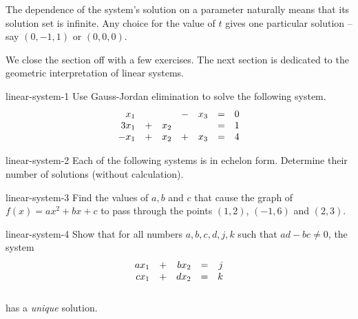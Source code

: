 The dependence of the system's solution on a parameter naturally means that its
solution set is infinite. Any choice for the value of $t$ gives one particular
solution -- say $(0,-1,1)$ or $(0,0,0)$.

We close the section off with a few exercises. The next section is dedicated to
the geometric interpretation of linear systems.

\begin{exercise}{}{linear-system-1}
 Use Gauss-Jordan elimination to solve the following system.
 \[
  \begin{array}{r c r c r c r}
   x_1 & &  & - & x_3 & = & 0\\
   3x_1 & + & x_2 & & & = & 1\\
   -x_1 & + & x_2 & + & x_3 & = & 4
  \end{array}
 \]
\end{exercise}

\begin{exercise}{}{linear-system-2}
 Each of the following systems is in echelon form. Determine their number of
 solutions (without calculation).
 \begin{center}
 \end{center}
\end{exercise}

\begin{exercise}{}{linear-system-3}
 Find the values of $a,b$ and $c$ that cause the graph of $f(x) = ax^2 + bx + c$
 to pass through the points $(1,2)$, $(-1,6)$ and $(2,3)$.
\end{exercise}

\begin{exercise}{}{linear-system-4}
 Show that for all numbers $a,b,c,d,j,k$ such that $ad - bc \neq 0$, the system
 \[
  \begin{array}{r c r c r}
   ax_1 & + & bx_2 & = & j\\
   cx_1 & + & dx_2 & = &k\\
    & & & &
  \end{array}
 \]
 has a \emph{unique} solution.
\end{exercise}
